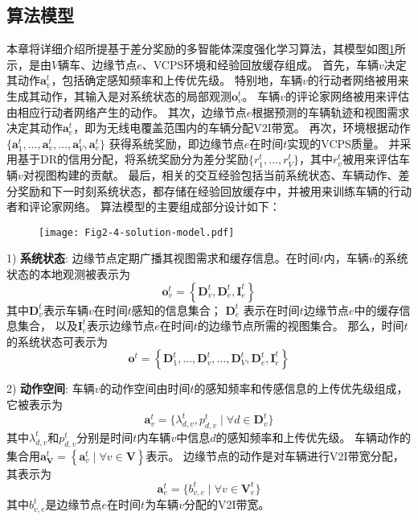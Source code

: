 \subsection{算法模型}
本章将详细介绍所提基于差分奖励的多智能体深度强化学习算法，其模型如图\ref{fig 2-4}所示，是由$V$辆车、边缘节点$e$、VCPS环境和经验回放缓存组成。
首先，车辆$v$决定其动作$\boldsymbol{a}_{v}^{t}$，包括确定感知频率和上传优先级。
特别地，车辆$v$的行动者网络被用来生成其动作，其输入是对系统状态的局部观测$\boldsymbol{o}_{v}^{t}$。
车辆$v$的评论家网络被用来评估由相应行动者网络产生的动作。
其次，边缘节点$e$根据预测的车辆轨迹和视图需求决定其动作$\boldsymbol{a}_{e}^{t}$，即为无线电覆盖范围内的车辆分配V2I带宽。
再次，环境根据动作$\{ \boldsymbol{a}_{1}^{t}, \ldots, \boldsymbol{a}_{v}^{t}, \ldots, \boldsymbol{a}_{V}^{t}, \boldsymbol{a}_{e}^{t}\}$ 获得系统奖励，即边缘节点$e$在时间$t$实现的VCPS质量。
并采用基于DR的信用分配，将系统奖励分为差分奖励$\{r_1^t, \ldots, r_{V}^t\}$，其中$r_v^t$被用来评估车辆$v$对视图构建的贡献。
最后，相关的交互经验包括当前系统状态、车辆动作、差分奖励和下一时刻系统状态，都存储在经验回放缓存中，并被用来训练车辆的行动者和评论家网络。
算法模型的主要组成部分设计如下：

\begin{figure}[h]
\centering
  \texttt{[image: Fig2-4-solution-model.pdf]}
  \label{fig 2-4}
\end{figure}

1) \textbf{系统状态}: 边缘节点定期广播其视图需求和缓存信息。在时间$t$内，车辆$v$的系统状态的本地观测被表示为 
	\begin{equation}
		\boldsymbol{o}_{v}^{t}=\left\{\mathbf{D}_{v}^{t}, \mathbf{D}_{e}^{t}, \mathbf{I}_e^t\right\}
	\end{equation} 
	\noindent 其中$\mathbf{D}_{v}^{t}$表示车辆$v$在时间$t$感知的信息集合；
	$\mathbf{D}_{e}^{t}$ 表示在时间$t$边缘节点$e$中的缓存信息集合，
	以及$\mathbf{I}_e^t$表示边缘节点$e$在时间$t$的边缘节点所需的视图集合。
	那么，时间$t$的系统状态可表示为
	\begin{equation}
		\boldsymbol{o}^{t}=\left\{\mathbf{D}_{1}^{t}, \ldots, \mathbf{D}_{v}^{t}, \ldots, \mathbf{D}_{V}^{t}, \mathbf{D}_{e}^{t}, \mathbf{I}_{e}^{t}\right\}
	\end{equation}

2) \textbf{动作空间}: 车辆$v$的动作空间由时间$t$的感知频率和传感信息的上传优先级组成，它被表示为 
	\begin{equation}
		\boldsymbol{a}_{v}^{t}=\{ \lambda_{d, v}^{t}, p_{d, v}^{t} \mid \forall d \in \mathbf{D}_{v}^t\}
	\end{equation}
	\noindent 其中$\lambda_{d, v}^{t}$和$p_{d, v}^{t}$分别是时间$t$内车辆$v$中信息$d$的感知频率和上传优先级。
	车辆动作的集合用$\boldsymbol{a}_{\mathbf{V}}^{t} = \left\{\boldsymbol{a}_{v}^{t}\mid \forall v \in \mathbf{V}\right\}$表示。
	边缘节点的动作是对车辆进行V2I带宽分配，其表示为 
	\begin{equation}
		\boldsymbol{a}_{e}^{t}=\{b_{v, e}^{t} \mid \forall v \in \mathbf{V}_{e}^{t}\}
	\end{equation}
	其中$b_{v, e}^t$是边缘节点$e$在时间$t$为车辆$v$分配的V2I带宽。
	
